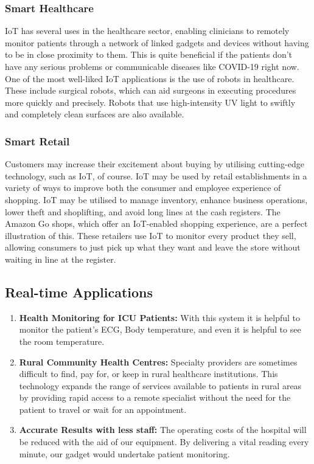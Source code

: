 \documentclass[12pt,a4paper,twocolumn,fleqn]{article}
\begin{document}
\subsubsection{Smart Healthcare}
IoT has several uses in the healthcare sector, enabling clinicians to remotely monitor patients through a network of linked gadgets and devices without having to be in close proximity to them. This is quite beneficial if the patients don't have any serious problems or communicable diseases like COVID-19 right now. One of the most well-liked IoT applications is the use of robots in healthcare. These include surgical robots, which can aid surgeons in executing procedures more quickly and precisely. Robots that use high-intensity UV light to swiftly and completely clean surfaces are also available.
\subsubsection{Smart Retail}
Customers may increase their excitement about buying by utilising cutting-edge technology, such as IoT, of course. IoT may be used by retail establishments in a variety of ways to improve both the consumer and employee experience of shopping. IoT may be utilised to manage inventory, enhance business operations, lower theft and shoplifting, and avoid long lines at the cash registers. The Amazon Go shops, which offer an IoT-enabled shopping experience, are a perfect illustration of this. These retailers use IoT to monitor every product they sell, allowing consumers to just pick up what they want and leave the store without waiting in line at the register.\\
\subsection{Real-time Applications}
\begin{enumerate}
    \item \textbf{Health Monitoring for ICU Patients:} With this system it is helpful to monitor the patient's ECG, Body temperature, and even it is helpful to see the room temperature.
    \item \textbf{Rural Community Health Centres:} Specialty providers are sometimes difficult to find, pay for, or keep in rural healthcare institutions. This technology expands the range of services available to patients in rural areas by providing rapid access to a remote specialist without the need for the patient to travel or wait for an appointment.
    \item \textbf{Accurate Results with less staff:} The operating costs of the hospital will be reduced with the aid of our equipment. By delivering a vital reading every minute, our gadget would undertake patient monitoring.
\end{enumerate} 
\end{document}
